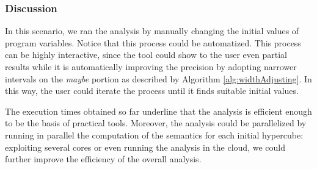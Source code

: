\subsubsection{Discussion}
In this scenario, we ran the analysis by manually changing the initial values of program variables. Notice that this process could be automatized. 
This process can be highly interactive, since the tool could show to the user even partial results while it is automatically improving the precision by adopting narrower intervals on the \emph{maybe} portion as described by Algorithm \ref{alg:widthAdjusting}. In this way, the user could iterate the process until it finds suitable initial values.

The execution times obtained so far underline that the analysis is efficient enough to be the basis of practical tools. Moreover, the analysis could be parallelized by running in parallel the computation of the semantics for each initial hypercube: exploiting several cores or even running the analysis in the cloud, we could further improve the efficiency of the overall analysis.

